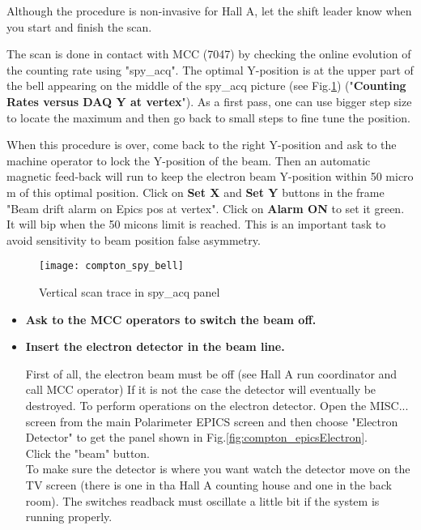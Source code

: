 {{Although the procedure is non-invasive for Hall A, let the shift leader know
when you start and finish the scan.

The scan is done in contact with MCC (7047) by checking the online evolution
        of the counting rate using "spy\_acq".
        The optimal Y-position is at the upper part of the bell appearing
        on the middle of the spy\_acq picture (see Fig.\ref{fig:compton_spy_bell}) 
	("{\bf Counting Rates versus DAQ Y
        at vertex}"). As a first pass, one can use bigger step size to locate
        the maximum and then go back to small steps to fine tune the position.

When this procedure is over, come back to the right Y-position and
        ask to the machine operator to lock the Y-position of the beam. Then an
        automatic magnetic feed-back will run to keep the electron beam Y-position
        within 50 micro m of this optimal position. Click on {\bf Set X} and
        {\bf Set Y} buttons in the frame "Beam drift alarm on Epics pos at vertex".
        Click on {\bf Alarm ON} to set it green. It will bip when the 50 micons limit
        is reached. This is an important task to avoid sensitivity to beam position
        false asymmetry.
\begin{figure}[htp]
    \begin{center}
        \texttt{[image: compton\_spy\_bell]}
    \end{center}
       \caption[compton:vertical scan]{Vertical scan trace in spy\_acq panel}
        \label{fig:compton_spy_bell}
\end{figure}

\begin{itemize}
\item {\bf Ask to the MCC operators to switch the beam off.}


\item {\bf Insert the electron detector in the beam line.}

First of all, the electron beam must
be off (see Hall A run coordinator and call MCC operator)
If it is not the case the detector will eventually be destroyed.
To perform operations on the electron detector. Open the MISC... screen from 
the main Polarimeter EPICS screen
and then choose "Electron Detector" to get the panel shown in 
Fig.\ref{fig:compton_epicsElectron}.\\

Click the "beam" button.\\
To make sure the detector is where you want watch the detector move on the TV screen (there is one
in tha Hall A counting house and one in the back room). The switches readback must oscillate a
little bit if the system is running properly.


\end{itemize}}}
